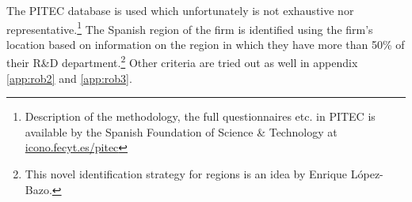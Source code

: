 \label{sec:data}
The PITEC database is used which unfortunately is not exhaustive nor representative.\footnote{Description of the methodology, the full questionnaires etc. in PITEC is available by the Spanish Foundation of Science \& Technology at \href{https://icono.fecyt.es/pitec}{icono.fecyt.es/pitec}} The Spanish region of the firm is identified using the firm's location based on information on the region in which they have more than 50\% of their R\&D department.\footnote{This novel identification strategy for regions is an idea by Enrique López-Bazo.} Other criteria are tried out as well in appendix \ref{app:rob2} and \ref{app:rob3}.


